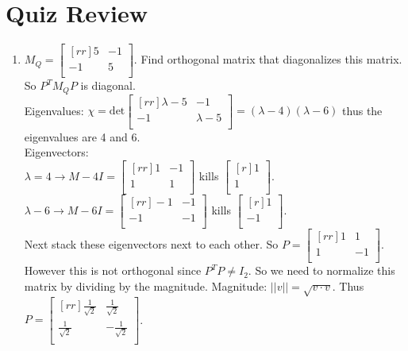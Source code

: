 \documentclass{report}
\theoremstyle{plain}
\theoremstyle{definition}
\theoremstyle{plain}
\begin{document}
\section{Quiz Review}
\begin{enumerate}
\item $M_Q = \begin{bmatrix}[rr]5&-1\\-1&5\\\end{bmatrix}$. Find orthogonal matrix that diagonalizes this matrix. So $P^TM_QP$ is diagonal.\\
Eigenvalues: $\chi = \mathrm{det}\begin{bmatrix}[rr]\lambda-5 & -1\\-1&\lambda-5\\\end{bmatrix} = (\lambda-4)(\lambda-6)$ thus the eigenvalues are 4 and 6.\\
Eigenvectors:\\
$\lambda=4 \rightarrow M-4I = \begin{bmatrix}[rr]1&-1\\1&1\\\end{bmatrix}$ kills $\begin{bmatrix}[r]1\\1\\\end{bmatrix}$.\\
$\lambda-6 \rightarrow M-6I = \begin{bmatrix}[rr]-1&-1\\-1&-1\\\end{bmatrix}$ kills $\begin{bmatrix}[r]1\\-1\\\end{bmatrix}$.\\
Next stack these eigenvectors next to each other. So $P=\begin{bmatrix}[rr]1&1\\1&-1\\\end{bmatrix}$. However this is not orthogonal since $P^TP \neq I_2$. So we need to normalize this matrix by dividing by the magnitude. Magnitude: $||v||=\sqrt{v\cdot v}$. Thus $P=\begin{bmatrix}[rr]\frac{1}{\sqrt{2}}&\frac{1}{\sqrt{2}}\\\frac{1}{\sqrt{2}}&-\frac{1}{\sqrt{2}}\\\end{bmatrix}$.
\end{enumerate}
\end{document}

